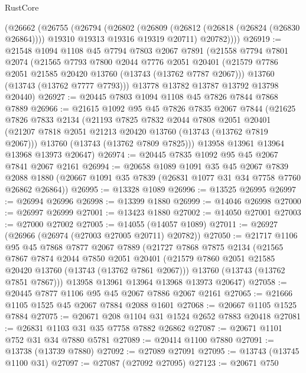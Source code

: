 \begin{lexlean}{RustCore}
\begin{coremodule}
    (@26662
      (@26755
        (@26794
          (@26802
            (@26809 (@26812 (@26818 (@26824 (@26830 @26864)))) @19310 @19313 @19316 @19319 @20711)
            @20782))))
@26919 := @21548
    @1094
    @1108
    @45
    @7794
    @7803
    @2067
    @7891
    (@21558
      @7794
      @7801
      @2074
      (@21565
        @7793
        @7800
        @2044
        @7776
        @2051
        @20401
        (@21579 @7786 @2051 @21585 @20420 @13760 (@13743 (@13762 @7787 @2067)))
        @13760
        (@13743 (@13762 @7777 @7793)))
      @13778
      @13782
      @13787
      @13792
      @13798
      @20440)
@26927 := @20445 @7803 @1094 @1108 @45 @7826 @7844 @7868 @7889
@26966 := @21615
    @1092
    @95
    @45
    @7826
    @7835
    @2067
    @7844
    (@21625
      @7826
      @7833
      @2134
      (@21193
        @7825
        @7832
        @2044
        @7808
        @2051
        @20401
        (@21207 @7818 @2051 @21213 @20420 @13760 (@13743 (@13762 @7819 @2067)))
        @13760
        (@13743 (@13762 @7809 @7825)))
      @13958
      @13961
      @13964
      @13968
      @13973
      @20647)
@26974 := @20445 @7835 @1092 @95 @45 @2067 @7841 @2067 @2161
@26994 := @20658
    @1089
    @1091
    @35
    @45
    @2067
    @7839
    @2088
    @1880
    (@20667 @1091 @35 @7839 (@26831 @1077 @31 @34 @7758 @7760 @26862 @26864))
@26995 := @13328 @1089
@26996 := @13525 @26995
@26997 := @26994 @26996
@26998 := @13399 @1880
@26999 := @14046 @26998
@27000 := @26997 @26999
@27001 := @13423 @1880
@27002 := @14050 @27001
@27003 := @27000 @27002
@27005 := @14055 (@14057 @1089)
@27011 := @26927 (@26966 (@26974 (@27003 @27005 @20711) @20782))
@27050 := @21717
    @1106
    @95
    @45
    @7868
    @7877
    @2067
    @7889
    (@21727
      @7868
      @7875
      @2134
      (@21565
        @7867
        @7874
        @2044
        @7850
        @2051
        @20401
        (@21579 @7860 @2051 @21585 @20420 @13760 (@13743 (@13762 @7861 @2067)))
        @13760
        (@13743 (@13762 @7851 @7867)))
      @13958
      @13961
      @13964
      @13968
      @13973
      @20647)
@27058 := @20445 @7877 @1106 @95 @45 @2067 @7886 @2067 @2161
@27065 := @21666 @1105 @1525 @45 @2067 @7884 @2088 @1601
@27068 := @20667 @1105 @1525 @7884
@27075 := @20671 @208 @1104 @31 @1524 @2652 @7883 @20418
@27081 := @26831 @1103 @31 @35 @7758 @7882 @26862
@27087 := @20671 @1101 @752 @31 @34 @7880 @5781
@27089 := @20414 @1100 @7880
@27091 := @13738 (@13739 @7880)
@27092 := @27089 @27091
@27095 := @13743 (@13745 @1100 @31)
@27097 := @27087 (@27092 @27095)
@27123 := @20671
    @750

\end{coremodule}
\end{lexlean}
